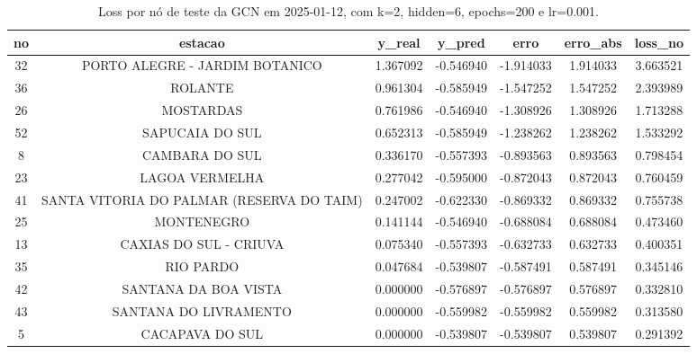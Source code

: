 \begin{table}[h]
\centering
\caption{Loss por nó de teste da GCN em 2025-01-12, com k=2, hidden=6, epochs=200 e lr=0.001.}
\label{tab:gcn_loss_nodes_k2_hidden6}
\begin{tabular}{ccccccc}
\toprule
no & estacao & y\_real & y\_pred & erro & erro\_abs & loss\_no \\
\midrule
32 & PORTO ALEGRE - JARDIM BOTANICO & 1.367092 & -0.546940 & -1.914033 & 1.914033 & 3.663521 \\
36 & ROLANTE & 0.961304 & -0.585949 & -1.547252 & 1.547252 & 2.393989 \\
26 & MOSTARDAS & 0.761986 & -0.546940 & -1.308926 & 1.308926 & 1.713288 \\
52 & SAPUCAIA DO SUL & 0.652313 & -0.585949 & -1.238262 & 1.238262 & 1.533292 \\
8 & CAMBARA DO SUL & 0.336170 & -0.557393 & -0.893563 & 0.893563 & 0.798454 \\
23 & LAGOA VERMELHA & 0.277042 & -0.595000 & -0.872043 & 0.872043 & 0.760459 \\
41 & SANTA VITORIA DO PALMAR (RESERVA DO TAIM) & 0.247002 & -0.622330 & -0.869332 & 0.869332 & 0.755738 \\
25 & MONTENEGRO & 0.141144 & -0.546940 & -0.688084 & 0.688084 & 0.473460 \\
13 & CAXIAS DO SUL - CRIUVA & 0.075340 & -0.557393 & -0.632733 & 0.632733 & 0.400351 \\
35 & RIO PARDO & 0.047684 & -0.539807 & -0.587491 & 0.587491 & 0.345146 \\
42 & SANTANA DA BOA VISTA & 0.000000 & -0.576897 & -0.576897 & 0.576897 & 0.332810 \\
43 & SANTANA DO LIVRAMENTO & 0.000000 & -0.559982 & -0.559982 & 0.559982 & 0.313580 \\
5 & CACAPAVA DO SUL & 0.000000 & -0.539807 & -0.539807 & 0.539807 & 0.291392 \\
\bottomrule
\end{tabular}
\end{table}
